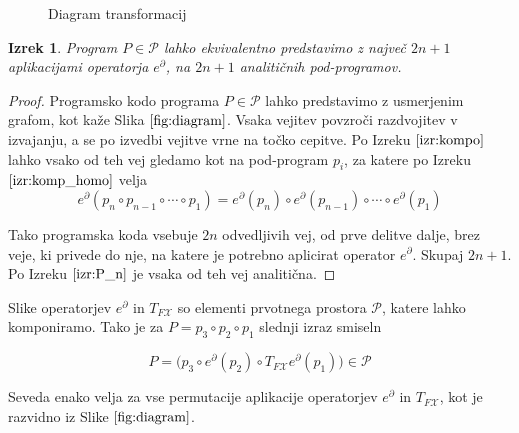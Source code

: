 \documentclass{article}
\newcommand{\X}{\mathcal{X}}
\newcommand{\dP}{\mathcal{P}}
\newcommand{\D}{\partial}
\newtheorem{izrek}{Izrek}[section]
\begin{document}
\begin{figure}[!h]
\vspace{3px}
\caption{Diagram transformacij} \label{fig:diagram} 
\end{figure}

\begin{izrek}
Program $P\in\dP$ lahko ekvivalentno predstavimo z največ $2n+1$ aplikacijami operatorja $e^\D$, na $2n+1$ analitičnih pod-programov.
\end{izrek}

\begin{proof}
	Programsko kodo programa $P\in\dP$ lahko predstavimo z usmerjenim grafom, kot kaže Slika $\ref{fig:diagram}$. Vsaka vejitev povzroči razdvojitev v izvajanju, a se po izvedbi vejitve vrne na točko cepitve.	
	Po Izreku $\ref{izr:kompo}$ lahko vsako od teh vej gledamo kot na pod-program $p_i$, za katere po Izreku $\ref{izr:komp_homo}$ velja $$e^\D(p_n\circ p_{n-1}\circ\cdots\circ p_1)=e^\D(p_n)\circ e^\D(p_{n-1})\circ\cdots\circ e^\D(p_1)$$
	
	Tako programska koda vsebuje $2n$ odvedljivih vej, od prve delitve dalje, brez veje, ki privede do nje, na katere je potrebno aplicirat operator $e^\D$. Skupaj $2n+1$. Po Izreku $\ref{izr:P_n}$ je vsaka od teh vej analitična.
\end{proof}

Slike operatorjev $e^\D$ in $T_{F\X}$ so elementi prvotnega prostora $\dP$, katere lahko komponiramo. Tako je za $P=p_3\circ p_2\circ p_1$ slednji izraz smiseln

\begin{equation}
P=\Big(p_3\circ e^ \D(p_2)\circ T_{F\X}e^\D(p_1)\Big) \in \dP
\end{equation}

Seveda enako velja za vse permutacije aplikacije operatorjev $e^\D$ in $T_{F\X}$, kot je razvidno iz Slike $\ref{fig:diagram}$.
\end{document}
